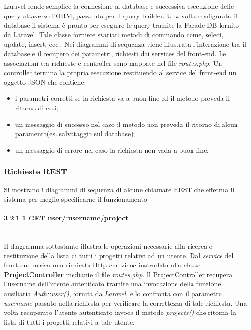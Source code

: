 Laravel rende semplice la connesione al database e successiva esecuzione delle query attaverso l'\gls{ORM}, passando per il query builder. Una volta configurato il \gls{database} il sistema è pronto per eseguire le query tramite la Facade DB fornito da \gls{Laravel}. Tale classe fornisce svariati metodi di commando come, select, update, insert, ecc..
Nei diagrammi di sequenza viene illustrata l'interazione tra il \gls{database} e il recupero dei parametri, richiesti dai services del front-end. Le associazioni tra richieste e controller sono mappate nel file \textit{routes.php}. Un controller termina la propria esecuzione restituendo al service del front-end un oggetto JSON che contiene:
\begin{itemize}
	\item i parametri corretti se la richiesta va a buon fine ed il metodo preveda il ritorno di essi;
	\item un messaggio di successo nel caso il metodo non preveda il ritorno di alcun paramento(es. salvataggio sul \gls{database});
	\item un messaggio di errore nel caso la richiesta non vada a buon fine.
\end{itemize}

\subsubsection{Richieste REST}
Si mostrano i diagrammi di sequenza di alcune chiamate REST che effettua il sistema per meglio specificarne il funzionamento.

\paragraph{3.2.1.1 GET user/:username/project}\mbox{}\\
Il diagramma sottostante illustra le operazioni necessarie alla ricerca e restituzione della lista di tutti i progetti relativi ad un utente. Dal \textit{service} del front-end arriva una richiesta Http che viene instradata alla classe \textbf{ProjectController} mediante il file \textit{routes.php}. Il ProjectController recupera l'username dell'utente autenticato tramite una invocazione della funzione ausiliaria \textit{Auth::user()}, fornita da \textit{Laravel}, e lo confronta con il parametro \textit{username} passato nella richiesta per verificare la correttezza di tale richiesta. Una volta recuperato l'utente autenticato invoca il metodo \textit{projects()} che ritorna la lista di tutti i progetti relativi a tale utente.

